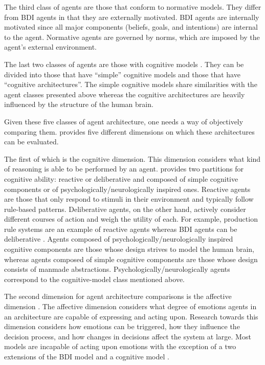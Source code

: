 The third class of agents are those that conform to normative models.
They differ from BDI agents in that they are externally motivated.
BDI agents are internally motivated since all major components (beliefs, goals, and intentions) are internal to the agent.
Normative agents are governed by norms, which are imposed by the agent's external environment.

The last two classes of agents are those with cognitive models \cite{balke_how_2014}.
They can be divided into those that have ``simple'' cognitive models and those that have ``cognitive architectures''.
The simple cognitive models share similarities with the agent classes presented above
whereas the cognitive architectures are heavily influenced by the structure of the human brain.

Given these five classes of agent architecture, one needs a way of objectively comparing them.
\cite{balke_how_2014} provides five different dimensions on which these architectures can be evaluated.

The first of which is the cognitive dimension.
This dimension considers what kind of reasoning is able to be performed by an agent.
\cite{balke_how_2014} provides two partitions for cognitive ability:
reactive or deliberative and composed of simple cognitive components or of psychologically/neurologically inspired ones.
Reactive agents are those that only respond to stimuli in their environment and typically follow rule-based patterns.
Deliberative agents, on the other hand, actively consider different courses of action and weigh the utility of each.
For example, production rule systems are an example of reactive agents whereas BDI agents can be deliberative \cite{balke_how_2014}.
Agents composed of psychologically/neurologically inspired cognitive components are those whose design strives to model the human brain,
whereas agents composed of simple cognitive components are those whose design consists of manmade abstractions.
Psychologically/neurologically agents correspond to the cognitive-model class mentioned above.

The second dimension for agent architecture comparisons is the affective dimension \cite{balke_how_2014}.
The affective dimension considers what degree of emotions agents in an architecture are capable of expressing and acting upon.
Research towards this dimension considers how emotions can be triggered, how they influence the decision process, and how changes in decisions affect the system at large.
Most models are incapable of acting upon emotions \cite{balke_how_2014} with the exception of a two extensions of the BDI model \cite{jiang_ebdi_2007, dignum_towards_2009} and a cognitive model \cite{urban_pecs_2000}.

